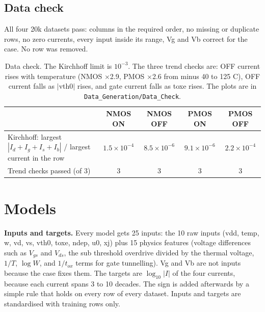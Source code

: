 \documentclass[10pt,a4paper]{article}
\begin{document}
\subsection{Data check}

All four 20k datasets pass: columns in the required order, no missing or duplicate rows, no zero currents, every input inside its range, Vg and Vb correct for the case. No row was removed.

\begin{table}[H]
\centering\small
\begin{tabular}{@{}lcccc@{}}
\toprule
 & NMOS ON & NMOS OFF & PMOS ON & PMOS OFF\\
\midrule
Kirchhoff: largest $|I_d+I_g+I_s+I_b|$ / largest current in the row & $1.5\times10^{-4}$ & $8.5\times10^{-6}$ & $9.1\times10^{-6}$ & $2.2\times10^{-4}$\\
Trend checks passed (of 3) & 3 & 3 & 3 & 3\\
\bottomrule
\end{tabular}
\caption{Data check. The Kirchhoff limit is $10^{-3}$. The three trend checks are: OFF current rises with temperature (NMOS $\times$2.9, PMOS $\times$2.6 from minus 40 to 125 \textdegree C), OFF current falls as $|$vth0$|$ rises, and gate current falls as toxe rises. The plots are in \texttt{Data\_Generation/Data\_Check}.}
\end{table}

\section{Models}

\textbf{Inputs and targets.} Every model gets 25 inputs: the 10 raw inputs (vdd, temp, w, vd, vs, vth0, toxe, ndep, u0, xj) plus 15 physics features (voltage differences such as $V_{gs}$ and $V_{ds}$, the sub threshold overdrive divided by the thermal voltage, $1/T$, $\log W$, and $1/t_{ox}$ terms for gate tunnelling). Vg and Vb are not inputs because the case fixes them. The targets are $\log_{10}|I|$ of the four currents, because each current spans 3 to 10 decades. The sign is added afterwards by a simple rule that holds on every row of every dataset. Inputs and targets are standardised with training rows only.
\end{document}

